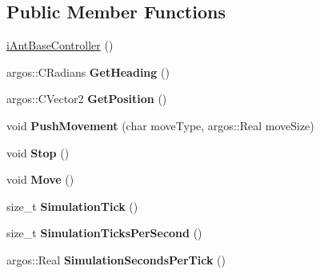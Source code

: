 \subsection*{Public Member Functions}
\begin{DoxyCompactItemize}
\item 
\hyperlink{classi_ant_base_controller_a39d8d48963c82c29e7c943e431782d9a}{i\+Ant\+Base\+Controller} ()
\item 
\hypertarget{classi_ant_base_controller_ad42ec34c309ab33a650b7f28defc490e}{}argos\+::\+C\+Radians {\bfseries Get\+Heading} ()\label{classi_ant_base_controller_ad42ec34c309ab33a650b7f28defc490e}

\item 
\hypertarget{classi_ant_base_controller_aadadf8a3f8fbc5844428ec000a61ea6b}{}argos\+::\+C\+Vector2 {\bfseries Get\+Position} ()\label{classi_ant_base_controller_aadadf8a3f8fbc5844428ec000a61ea6b}

\item 
\hypertarget{classi_ant_base_controller_a27f63778f8fce4febcab7624f768cb0c}{}void {\bfseries Push\+Movement} (char move\+Type, argos\+::\+Real move\+Size)\label{classi_ant_base_controller_a27f63778f8fce4febcab7624f768cb0c}

\item 
\hypertarget{classi_ant_base_controller_a6e787198db6760b91130e3ec34038e1d}{}void {\bfseries Stop} ()\label{classi_ant_base_controller_a6e787198db6760b91130e3ec34038e1d}

\item 
\hypertarget{classi_ant_base_controller_af56e1a91b585793bcc877ee8b8f86d09}{}void {\bfseries Move} ()\label{classi_ant_base_controller_af56e1a91b585793bcc877ee8b8f86d09}

\item 
\hypertarget{classi_ant_base_controller_ac30e46e9048ce888af15fde012f9ba4e}{}size\+\_\+t {\bfseries Simulation\+Tick} ()\label{classi_ant_base_controller_ac30e46e9048ce888af15fde012f9ba4e}

\item 
\hypertarget{classi_ant_base_controller_aef393e9abb3037572f68f8c6884cfab3}{}size\+\_\+t {\bfseries Simulation\+Ticks\+Per\+Second} ()\label{classi_ant_base_controller_aef393e9abb3037572f68f8c6884cfab3}

\item 
\hypertarget{classi_ant_base_controller_a6a5c40fe9e57d61a50ff58abda6cda48}{}argos\+::\+Real {\bfseries Simulation\+Seconds\+Per\+Tick} ()\label{classi_ant_base_controller_a6a5c40fe9e57d61a50ff58abda6cda48}

\end{DoxyCompactItemize}
